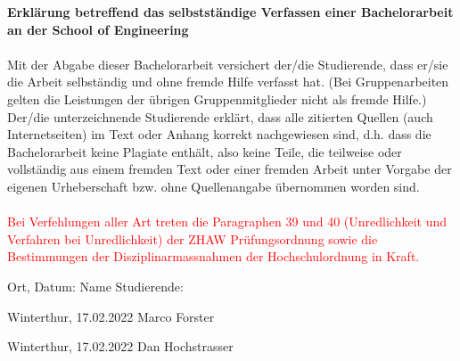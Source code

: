 \vspace*{\fill}

\textbf{Erklärung betreffend das selbstständige Verfassen einer Bachelorarbeit an der School of Engineering} \\~\\

Mit der Abgabe dieser Bachelorarbeit versichert der/die Studierende, dass er/sie die Arbeit selbständig und ohne fremde Hilfe verfasst hat. (Bei Gruppenarbeiten gelten die Leistungen der übrigen Gruppenmitglieder nicht als fremde Hilfe.) \\
Der/die unterzeichnende Studierende erklärt, dass alle zitierten Quellen (auch Internetseiten) im Text oder Anhang korrekt nachgewiesen sind, d.h. dass die Bachelorarbeit keine Plagiate enthält, also keine Teile, die teilweise oder vollständig aus einem fremden Text oder einer fremden Arbeit unter Vorgabe der eigenen Urheberschaft bzw. ohne Quellenangabe übernommen worden sind. \\~\\

\textcolor{red}{Bei Verfehlungen aller Art treten die Paragraphen 39 und 40 (Unredlichkeit und Verfahren bei Unredlichkeit) der ZHAW Prüfungsordnung sowie die Bestimmungen der Disziplinarmassnahmen der Hochschulordnung in Kraft.}

\vspace{15mm}

Ort, Datum: \hspace{25mm} Name Studierende:

Winterthur, 17.02.2022 \hspace{6mm} Marco Forster

Winterthur, 17.02.2022 \hspace{6mm} Dan Hochstrasser

\vspace*{\fill}
